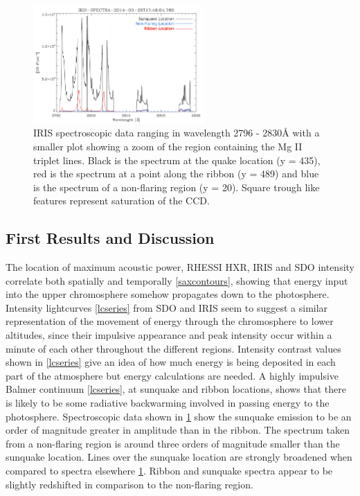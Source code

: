\begin{figure}\label{spectra}
  \begin{center}
  \includegraphics[width=0.58\textwidth]{spectra}
  \end{center}
  \caption{IRIS spectroscopic data ranging in wavelength 2796 - 2830Å with a smaller plot showing a zoom of the region containing the Mg II triplet lines. Black is the spectrum at the quake location (y = 435), red is the spectrum at a point along the ribbon (y = 489) and blue is the spectrum of a non-flaring region (y = 20). Square trough like features represent saturation of the CCD.}
\end{figure}
 

\subsection{First Results and Discussion}
The location of maximum acoustic power, RHESSI HXR, IRIS and SDO intensity correlate both spatially and temporally \ref{saxcontours}, showing that energy input into the upper chromosphere somehow propagates down to the photosphere. Intensity lightcurves \ref{lcseries} from SDO and IRIS seem to suggest a similar representation of the movement of energy through the chromosphere to lower altitudes, since their impulsive appearance and peak intensity occur within a minute of each 
other throughout the different regions. Intensity contrast values shown in \ref{lcseries} give an idea of how much energy is being deposited in each part of the atmosphere but energy calculations are needed. A highly impulsive Balmer continuum \ref{lcseries}, at sunquake and ribbon locations, shows that there is likely to be some radiative backwarming involved in passing energy to the photosphere. Spectroscopic data shown in \ref{spectra} show the sunquake emission to be an order of magnitude greater in amplitude than in the ribbon. The spectrum taken from a non-flaring region is around three orders of magnitude smaller than the sunquake location. Lines over the sunquake location are strongly broadened when compared to spectra elsewhere \ref{spectra}. Ribbon and sunquake spectra appear to be slightly redshifted in comparison to the non-flaring region.\\


